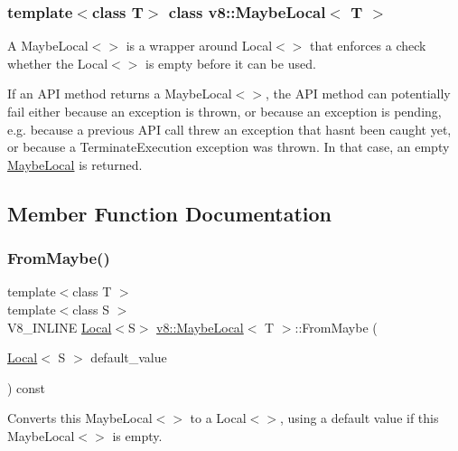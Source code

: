 \subsubsection*{template$<$class T$>$\newline
class v8\+::\+Maybe\+Local$<$ T $>$}

A Maybe\+Local$<$$>$ is a wrapper around Local$<$$>$ that enforces a check whether the Local$<$$>$ is empty before it can be used.

If an A\+PI method returns a Maybe\+Local$<$$>$, the A\+PI method can potentially fail either because an exception is thrown, or because an exception is pending, e.\+g. because a previous A\+PI call threw an exception that hasn\textquotesingle{}t been caught yet, or because a Terminate\+Execution exception was thrown. In that case, an empty \mbox{\hyperlink{classv8_1_1MaybeLocal}{Maybe\+Local}} is returned. 

\subsection{Member Function Documentation}
\mbox{\label{classv8_1_1MaybeLocal_ad99cb1e7ac1a4eac34c144faa4262407}} 
\subsubsection{\texorpdfstring{From\+Maybe()}{FromMaybe()}}
{\footnotesize\ttfamily template$<$class T $>$ \\
template$<$class S $>$ \\
V8\+\_\+\+I\+N\+L\+I\+NE \mbox{\hyperlink{classv8_1_1Local}{Local}}$<$S$>$ \mbox{\hyperlink{classv8_1_1MaybeLocal}{v8\+::\+Maybe\+Local}}$<$ T $>$\+::From\+Maybe (\begin{DoxyParamCaption}\item[{\mbox{\hyperlink{classv8_1_1Local}{Local}}$<$ S $>$}]{default\+\_\+value }\end{DoxyParamCaption}) const\hspace{0.3cm}{\ttfamily [inline]}}

Converts this Maybe\+Local$<$$>$ to a Local$<$$>$, using a default value if this Maybe\+Local$<$$>$ is empty. \mbox{\label{classv8_1_1MaybeLocal_aa12fc83adccbf02f502a2aaeed9c32ab}} 
